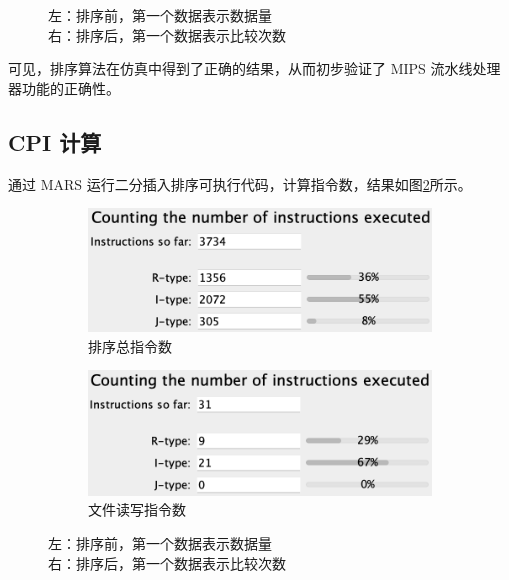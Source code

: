 \documentclass[a4paper]{article}  %
\begin{document}
\begin{figure}[ht]
\begin{subfigure}[b]{0.48\textwidth}
    \end{subfigure}
    \caption{
        左：排序前，第一个数据表示数据量 \\
        右：排序后，第一个数据表示比较次数
    }\label{fig:simulation_sort}
\end{figure}

可见，排序算法在仿真中得到了正确的结果，从而初步验证了 MIPS 流水线处理器功能的正确性。

\subsection{CPI 计算}

通过 MARS 运行二分插入排序可执行代码，计算指令数，结果如图\ref{fig:instruction_count_sort}所示。

\begin{figure}[ht]
    \centering
    \begin{subfigure}[b]{0.45\textwidth}
        \centering
        \includegraphics[width=\textwidth]{asserts/instruction_count_sort.png}
        \caption{
            排序总指令数
        }\label{fig:instruction_count_sort}
    \end{subfigure}
    \hfill
    \begin{subfigure}[b]{0.45\textwidth}
        \centering
        \includegraphics[width=\textwidth]{asserts/instruction_count_io.png}
        \caption{
            文件读写指令数
        }\label{fig:instruction_count_io}
    \end{subfigure}
    \caption{
        左：排序前，第一个数据表示数据量 \\
        右：排序后，第一个数据表示比较次数
    }\label{fig:instruction_count}
\end{figure}
\end{document}

